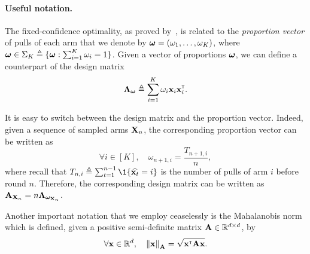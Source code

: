 \paragraph{Useful notation.}
The fixed-confidence optimality, as proved by~\cite{garivier2016tracknstop,russo2016ttts}, is related to the \emph{proportion vector} of pulls of each arm that we denote by ${\boldsymbol \omega} = (\omega_1,\ldots,\omega_K)$, where ${\boldsymbol \omega}\in\Sigma_K \triangleq \{{\boldsymbol \omega} : \sum_{i=1}^K \omega_i = 1\}$. Given a vector of proportions ${\boldsymbol \omega}$, we can define a counterpart of the design matrix 
\[
    {\boldsymbol \Lambda}_{{\boldsymbol \omega}} \triangleq \sum_{i=1}^K \omega_i{\bf x}_i{\bf x}_i^\mathsf{\scriptscriptstyle T}.
\]

It is easy to switch between the design matrix and the proportion vector. Indeed, given a sequence of sampled arms ${\bf X}_n$, the corresponding proportion vector can be written as
\[
    \forall i\in [K], \quad \omega_{n+1,i} = \frac{T_{n+1,i}}{n},
\]
where recall that $T_{n,i} \eqdef \sum_{t=1}^{n-1} \1\{\hat{\bx_t} = i\}$ is the number of pulls of arm $i$ before round $n$. Therefore, the corresponding design matrix can be written as ${\bf A}_{{\bf X}_n}=n{\boldsymbol \Lambda}_{{\boldsymbol \omega}_{{\bf X}_n}}$.

Another important notation that we employ ceaselessly is the Mahalanobis norm which is defined, given a positive semi-definite matrix ${\bf A}\in\mathbb{R}^{d\times d}$, by
\[
    \forall {\bf x}\in\mathbb{R}^d, \quad \left\lVert{\bf x}\right\rVert_{{\bf A}} = \sqrt{{\bf x}^\mathsf{\scriptscriptstyle T}{\bf A}{\bf x}}.
\]
